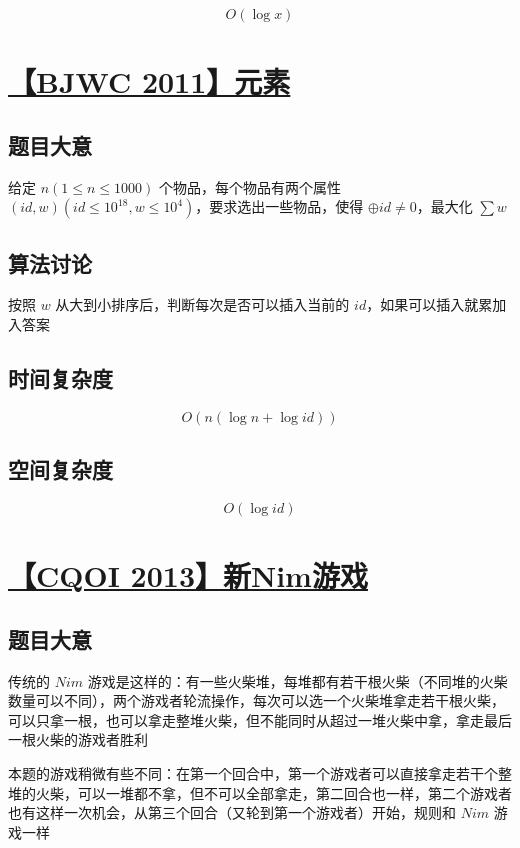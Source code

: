 \documentclass[UTF8]{article}
\begin{document}
$$
O(\log x)
$$

\section{\href{https://www.lydsy.com/JudgeOnline/problem.php?id=2460}{【BJWC 2011】元素}}

\subsection{题目大意}

给定 $n(1 \le n \le 1000)$ 个物品，每个物品有两个属性 $(id,w)(id \le 10^{18},w \le 10^4)$，要求选出一些物品，使得 $\oplus id \not= 0$，最大化 $\sum w$

\subsection{算法讨论}

按照 $w$ 从大到小排序后，判断每次是否可以插入当前的 $id$，如果可以插入就累加入答案

\subsection{时间复杂度}

$$
O(n (\log n + \log id))
$$

\subsection{空间复杂度}

$$
O(\log id)
$$

\section{\href{https://www.lydsy.com/JudgeOnline/problem.php?id=3105}{【CQOI 2013】新Nim游戏}}

\subsection{题目大意}

传统的 $Nim$ 游戏是这样的：有一些火柴堆，每堆都有若干根火柴（不同堆的火柴数量可以不同），两个游戏者轮流操作，每次可以选一个火柴堆拿走若干根火柴，可以只拿一根，也可以拿走整堆火柴，但不能同时从超过一堆火柴中拿，拿走最后一根火柴的游戏者胜利

本题的游戏稍微有些不同：在第一个回合中，第一个游戏者可以直接拿走若干个整堆的火柴，可以一堆都不拿，但不可以全部拿走，第二回合也一样，第二个游戏者也有这样一次机会，从第三个回合（又轮到第一个游戏者）开始，规则和 $Nim$ 游戏一样
\end{document}
